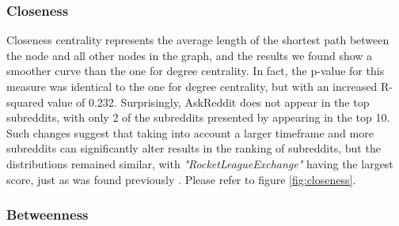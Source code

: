 \documentclass[bsc,frontabs,twoside,singlespacing,parskip,deptreport]{infthesis}
\begin{document}
\subsubsection{Closeness}

Closeness centrality represents the average length of the shortest path between the node and all other nodes in the graph, and the results we found show a smoother curve than the one for degree centrality. In fact, the p-value for this measure was identical to the one for degree centrality, but with an increased R-squared value of 0.232. Surprisingly, AskReddit does not appear in the top subreddits, with only 2 of the subreddits presented by \cite{masters} appearing in the top 10. Such changes suggest that taking into account a larger timeframe and more subreddits can significantly alter results in the ranking of subreddits, but the distributions remained similar, with \textit{"RocketLeagueExchange"} having the largest score, just as was found previously \cite{masters}. Please refer to figure \ref{fig:closeness}.

\begin{table}[!h]
\centering
{}
\caption{Top 10 subreddits ordered by their closeness score}
\label{top-closeness}
\end{table}

\subsubsection{Betweenness}
\end{document}
